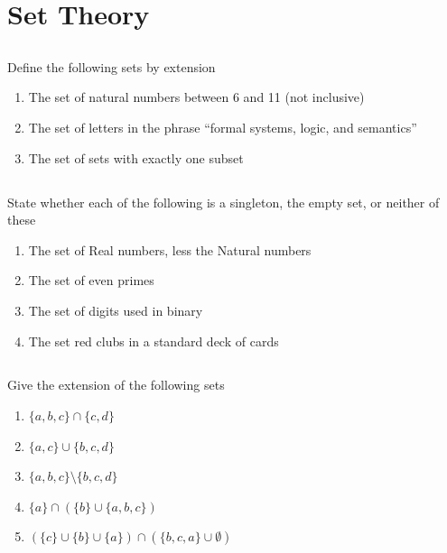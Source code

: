 \documentclass[twocolumn]{article}
\begin{document}
\clearpage
\section{Set Theory}

\subsection{}

    Define the following sets by extension

    \begin{enumerate}
        \item The set of natural numbers between 6 and 11 (not inclusive)
        \item The set of letters in the phrase ``formal systems, logic, and semantics''
        \item The set of sets with exactly one subset
    \end{enumerate}

\subsection{}

    State whether each of the following is a singleton, the empty set, or neither of these

    \begin{enumerate}
        \item The set of Real numbers, less the Natural numbers
        \item The set of even primes
        \item The set of digits used in binary
        \item The set red clubs in a standard deck of cards
    \end{enumerate}

\subsection{}

    Give the extension of the following sets

    \begin{enumerate}
        \item $\{ a, b, c \} \cap \{ c, d \} $
        \item $\{ a, c \} \cup \{ b, c, d \} $
        \item $\{ a, b, c \} \setminus \{ b, c, d \} $
        \item $\{ a \} \cap ( \{ b \} \cup \{a, b, c\} ) $
        \item $ (\{ c \} \cup \{ b \} \cup \{a\}) \cap ( \{b, c, a\} \cup \emptyset ) $
    \end{enumerate}
\end{document}
